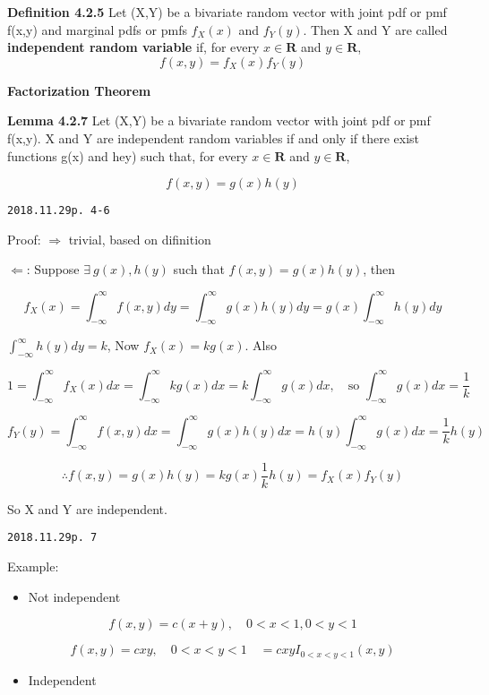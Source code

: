 \documentclass[]{tufte-book}
\providecommand{\tightlist}{%
  \setlength{\itemsep}{0pt}\setlength{\parskip}{0pt}}
\begin{document}
\textbf{Definition 4.2.5} Let (X,Y) be a bivariate random vector with
joint pdf or pmf f(x,y) and marginal pdfs or pmfs \(f_X(x)\) and
\(f_Y(y)\). Then X and Y are called \textbf{independent random variable}
if, for every \(x\in\mathbf{R}\) and \(y\in\mathbf{R}\),
\[f(x,y) = f_X(x)f_Y(y)\]

\textbf{Factorization Theorem}

\textbf{Lemma 4.2.7} Let (X,Y) be a bivariate random vector with joint
pdf or pmf f(x,y). X and Y are independent random variables if and only
if there exist functions g(x) and hey) such that, for every
\(x\in\mathbf{R}\) and \(y\in\mathbf{R}\),

\[f(x,y)=g(x)h(y)\]

\texttt{2018.11.29\textasciigrave{}\textasciigrave{}p.\ 4-6}

Proof: \(\Rightarrow\) trivial, based on difinition

\(\Leftarrow\): Suppose \(\exists\ g(x),h(y)\) such that
\(f(x,y)=g(x)h(y)\), then

\[f_X(x)=\int_{-\infty}^{\infty}f(x,y)dy=\int_{-\infty}^{\infty}g(x)h(y)dy=g(x)\int_{-\infty}^{\infty}h(y)dy\]

\(\int_{-\infty}^{\infty}h(y)dy=k\), Now \(f_X(x)=kg(x)\). Also

\[1=\int_{-\infty}^{\infty}f_X(x)dx=\int_{-\infty}^{\infty}kg(x)dx=k\int_{-\infty}^{\infty}g(x)dx,\quad \text{so } \int_{-\infty}^{\infty}g(x)dx=\frac1k\]

\[f_Y(y)=\int_{-\infty}^{\infty}f(x,y)dx=\int_{-\infty}^{\infty}g(x)h(y)dx=h(y)\int_{-\infty}^{\infty}g(x)dx=\frac1kh(y)\]

\[\therefore f(x,y)=g(x)h(y)=kg(x)\frac1kh(y)=f_X(x)f_Y(y)\]

So X and Y are independent.

\texttt{2018.11.29\textasciigrave{}\textasciigrave{}p.\ 7}

Example:

\begin{itemize}
\tightlist
\item
  Not independent
\end{itemize}

\[f(x,y)=c(x+y),\quad 0<x<1, 0<y<1\]

\[f(x,y)=cxy,\quad 0<x<y<1\quad =cxyI_{0<x<y<1}(x,y) \]

\begin{itemize}
\tightlist
\item
  Independent
\end{itemize}
\end{document}

